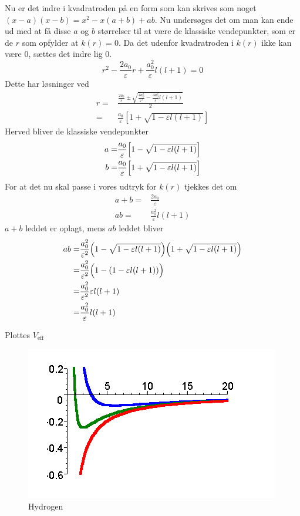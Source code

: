 Nu er det indre i kvadratroden på en form som kan skrives som noget $(x-a)(x-b) = x^2 -x(a+b) + ab$. Nu undersøges det om man kan ende ud med at få disse $a$ og $b$ størrelser til at være de klassiske vendepunkter, som er de $r$ som opfylder at $k(r) = 0$.
Da det udenfor kvadratroden i $k(r)$ ikke kan være 0, sættes det indre lig 0.
\begin{equation}
  r^2 - \frac{2a_0}{\varepsilon}r + \frac{a_0^2}{\varepsilon}l(l+1) = 0
\end{equation}
Dette har løsninger ved
\begin{align}
  r = & \frac{\frac{2a_0}{\varepsilon} \pm \sqrt{\frac{4a_0^2}{\varepsilon^2} - \frac{4a_0^2}{\varepsilon}l(l+1)   }  }{2}\\
    = & \frac{a_0}{\varepsilon}[1+\sqrt{1-\varepsilon l(l+1)}]
\end{align}
Herved bliver de klassiske vendepunkter
\begin{align}
  a = & \frac{a_0}{\varepsilon}\Bigl[1-\sqrt{1-\varepsilon l(l+1)}  \Bigr]\\
  b = & \frac{a_0}{\varepsilon}\Bigl[1+\sqrt{1-\varepsilon l(l+1)}  \Bigr]
\end{align}
For at det nu skal passe i vores udtryk for $k(r)$ tjekkes det om
\begin{align}
  a+b = & \frac{2a_0}{\varepsilon} \\
  ab  = & \frac{a_0^2}{\varepsilon} l(l+1)
\end{align}
$a+b$ leddet er oplagt, mens $ab$ leddet bliver
\begin{align}
  ab = & \frac{a_0^2}{\varepsilon^2}\Bigl(1-\sqrt{1-\varepsilon l(l+1)} \Bigr)\Bigl(1+\sqrt{1-\varepsilon l(l+1)} \Bigr)\\
     = & \frac{a_0^2}{\varepsilon^2}\Bigl(1-(1-\varepsilon l(l+1)) \Bigr)\\
     = & \frac{a_0^2}{\varepsilon^2} \varepsilon l(l+1)\\
     = & \frac{a_0^2}{\varepsilon} l(l+1)
\end{align}



Plottes $V_{\text{eff}}$

\begin{figure}[h!]
    \centering
    \includegraphics[width=\columnwidth]{hydrogen}
    \caption{Hydrogen}
    \label{fig:hydrogen}
\end{figure}


%

